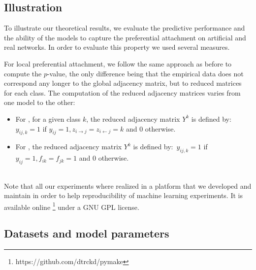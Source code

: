 
\subsection{Illustration}
\label{sec:exps}

To illustrate our theoretical results, we evaluate the predictive performance and the ability of the models to capture the preferential attachment on artificial and real networks. In order to evaluate this property we used several measures.




For local preferential attachment, we follow the same approach as before to compute the $p$-value, the only difference being that the empirical data does not correspond any longer to the global adjacency matrix, but to reduced matrices for each class. The computation of the reduced adjacency matrices varies from one model to the other:
%
\begin{itemize}
    \item For \imb, for a given class $k$, the reduced adjacency matrix $Y^k$ is defined by:~$y_{ij,k}=1$ if $y_{ij}=1, z_{i\rightarrow j}=z_{i\leftarrow j}=k$ and $0$ otherwise.
    \item For \ifm, the reduced adjacency matrix $Y^k$ is defined by:~$ y_{ij,k}=1$ if $y_{ij}=1 , f_{ik}=f_{jk}=1$ and $0$ otherwise.
\end{itemize}~\\


Note that all our experiments where realized in a platform that we developed and maintain in order to help reproducibility of machine learning experiments. It is available online \footnote{https://github.com/dtrckd/pymake} under a GNU GPL license.

\subsection{Datasets and model parameters}

